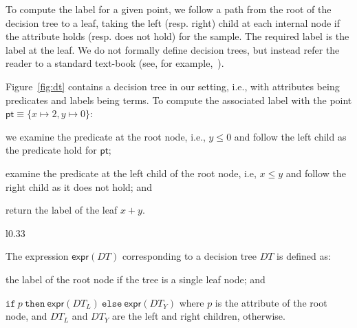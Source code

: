 \documentclass{llncs}
\newcommand\Point{\mathsf{pt}}
\newcommand\Pred{p}
\newcommand\ITE[3]{\mathtt{if}~#1~\mathtt{then}~#2~\mathtt{else}~#3}
\newcommand\DecisionTree{\mathit{DT}}
\newcommand\DTtoExpr[1]{\mathsf{expr}(#1)}
\newcommand\node{v}
\begin{document}
To compute the label for a given point, we follow a path from the root
of the decision tree to a leaf, taking the left (resp. right) child at
each internal node if the attribute holds (resp.  does not hold) for the
sample.
The required label is the label at the leaf.
We do not formally define decision trees, but instead refer the reader
to a standard text-book (see, for example,~\cite{bishop-book}).

\begin{example}
  Figure~\ref{fig:dt} contains a decision tree in our setting, i.e.,
  with attributes being predicates and labels being terms.
  To compute the associated label with the point $\Point \equiv \{ x
  \mapsto 2, y \mapsto 0 \}$:
  \begin{inparaenum}[(a)]
  \item we examine the predicate at the root node, i.e., $y \leq 0$ and
    follow the left child as the predicate hold for $\Point$;
  \item examine the predicate at the left child of the root node, i.e,
    $x \leq y$ and follow the right child as it does not hold; and
  \item return the label of the leaf $x + y$.
  \end{inparaenum}
\end{example}
\vspace*{-1ex}

\begin{wrapfigure}{l}{0.33\textwidth}
  \centering
  \vspace*{1pt}
  \caption{Sample decision tree}
  \label{fig:dt}
\end{wrapfigure}
\noindent
The expression $\DTtoExpr{\DecisionTree}$ corresponding to a
decision tree $\DecisionTree$ is defined as:
\begin{inparaenum}[(a)]
\item the label of the root node if the tree is a single leaf node; and
\item
  $\ITE{\Pred}{\DTtoExpr{\DecisionTree_L}}{\DTtoExpr{\DecisionTree_Y}}$
  where $\Pred$ is the attribute of the root node, and $\DecisionTree_L$ and
  $\DecisionTree_Y$ are the left and right children, otherwise.
\end{inparaenum}
\end{document}
